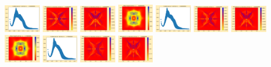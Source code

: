 \documentclass[11pt]{article}
\begin{document}
\includegraphics[width=0.11875\textwidth]{frame0035fig1.png}
\includegraphics[width=0.11875\textwidth]{frame0035fig2.png}
\includegraphics[width=0.11875\textwidth]{frame0035fig3.png}
\vskip 10pt 
\includegraphics[width=0.11875\textwidth]{frame0036fig0.png}
\includegraphics[width=0.11875\textwidth]{frame0036fig1.png}
\includegraphics[width=0.11875\textwidth]{frame0036fig2.png}
\includegraphics[width=0.11875\textwidth]{frame0036fig3.png}
\includegraphics[width=0.11875\textwidth]{frame0037fig0.png}
\includegraphics[width=0.11875\textwidth]{frame0037fig1.png}
\includegraphics[width=0.11875\textwidth]{frame0037fig2.png}
\includegraphics[width=0.11875\textwidth]{frame0037fig3.png}
\end{document}
